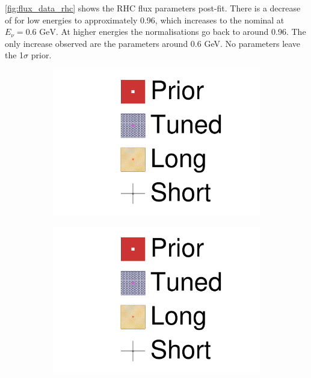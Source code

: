 \autoref{fig:flux_data_rhc} shows the RHC flux parameters post-fit. There is a decrease of \numubar for low energies to approximately 0.96, which increases to the nominal at $E_\nu=0.6\text{ GeV}$. At higher energies the normalisations go back to around 0.96. The only increase observed are the \nuebar parameters around 0.6 GeV. No parameters leave the 1$\sigma$ prior.
\begin{figure}[h]	
	\begin{subfigure}[t]{0.1\textwidth}
		\includegraphics[width=\textwidth, trim={0mm 150mm 50mm 0mm}, clip,page=1]{figures/mach3/data/2017b_NewData_NewDet_UpdXsecStep_2Xsec_4Det_5Flux_0_2017b_June_NewDet_merge_2017b_NewDet_June_Long_0}
	\end{subfigure}
	\begin{subfigure}[t]{0.1\textwidth}
		\includegraphics[width=\textwidth, trim={0mm 100mm 50mm 50mm}, clip,page=1]{figures/mach3/data/2017b_NewData_NewDet_UpdXsecStep_2Xsec_4Det_5Flux_0_2017b_June_NewDet_merge_2017b_NewDet_June_Long_0}

\end{subfigure}
\end{figure}
